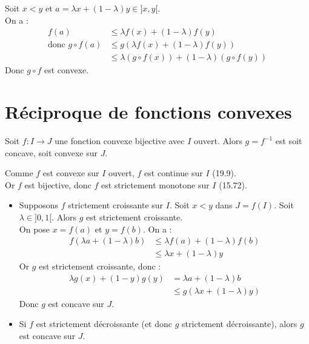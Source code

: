 \documentclass[../main.tex]{subfiles}
\begin{document}
\noindent Soit $x < y$ et $a = \lambda x + (1-\lambda)y \in ]x, y[$. \\
On a :
\begin{align*}
    f(a) &\leq \lambda f(x) + (1-\lambda)f(y) \\
    \text{donc } g\circ f(a) &\leq g(\lambda f(x) + (1-\lambda)f(y)) \\
    &\leq \lambda (g\circ f(x)) + (1-\lambda)(g\circ f(y))
\end{align*}
Donc $g\circ f$ est convexe. 

\section{Réciproque de fonctions convexes}
\begin{tcolorbox}[title=Propostion 19.19, title filled=false, colframe=lightblue, colback=lightblue!10!white]
    Soit $f:I\to J$ une fonction convexe bijective avec $I$ ouvert. Alors $g=f^{-1}$ est soit concave, soit convexe sur $J$. 
\end{tcolorbox}

\noindent Comme $f$ est convexe sur $I$ ouvert, $f$ est continue sur $I$ (19.9). \\
Or $f$ est bijective, donc $f$ est strictement monotone sur $I$ (15.72). \\
\begin{itemize}
    \item Supposons $f$ strictement croissante sur $I$. Soit $x < y$ dans $J = f(I)$. Soit $\lambda \in ]0, 1[$. Alors $g$ est strictement croissante. \\
    On pose $x = f(a)$ et $y = f(b)$. On a :
    \begin{align*}
        f(\lambda a + (1-\lambda)b) &\leq \lambda f(a) + (1-\lambda)f(b) \\
        &\leq \lambda x + (1-\lambda)y
    \end{align*}
    Or $g$ est strictement croissante, donc : 
    \begin{align*}
        \lambda g(x) + (1-y) g(y) &= \lambda a + (1-\lambda)b \\
        &\leq g(\lambda x + (1-\lambda)y)
    \end{align*}
    Donc $g$ est concave sur $J$. 

    \item Si $f$ est strictement décroissante (et donc $g$ strictement décroissante), alors $g$ est concave sur $J$. 
\end{itemize}
\end{document}
